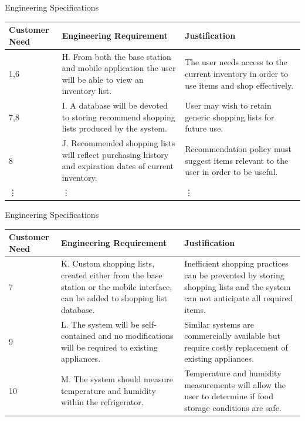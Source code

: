 \documentclass{beamer}
\begin{document}
\begin{frame}{Engineering Specifications}
\footnotesize
\begin{tabular}{| p{0.6in} | p{2in} |p{1.5in} |}
\hline
Customer Need & Engineering Requirement & Justification \\
\hline
1,6&H. From both the base station and mobile application the user will be able to view an inventory list.&The user needs access to the current inventory in order to use items and shop effectively.\\
\hline
7,8&I. A database will be devoted to storing recommend shopping lists produced by the system.&User may wish to retain generic shopping lists for future use.\\
\hline
8&J. Recommended shopping lists will reflect purchasing history and expiration dates of current inventory.&Recommendation policy must suggest items relevant to the user in order to be useful.\\
\hline
\vdots & \vdots & \vdots \\
\hline

\end{tabular}
\end{frame}

\begin{frame}{Engineering Specifications}
\footnotesize
\begin{tabular}{| p{0.6in} | p{2in} |p{1.5in} |}
\hline
Customer Need & Engineering Requirement & Justification \\
\hline
7&K. Custom shopping lists, created either from the base station or the mobile interface, can be added to shopping list database.&Inefficient shopping practices can be prevented by storing shopping lists and the system can not anticipate all required items.\\
\hline
9&L. The system will be self-contained and no modifications will be required to existing appliances.&Similar systems are commercially available but require costly replacement of existing appliances.\\
\hline
10&M. The system should measure temperature and humidity within the refrigerator. & Temperature and humidity measurements will allow the user to determine if food storage conditions are safe. \\
\hline
\end{tabular}
\end{frame}
\end{document}
